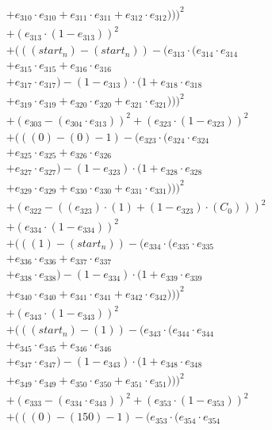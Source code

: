 \documentclass[10pt, a4paper]{article}
\begin{document}
\begin{small}
\begin{align*}
& + e_{310} \cdot e_{310} + e_{311} \cdot e_{311} + e_{312} \cdot e_{312})))^{2} \\
& + (e_{313} \cdot (1 - e_{313}))^{2} \\
& + (((start_n) - (start_n)) - (e_{313} \cdot (e_{314} \cdot e_{314} \\
& + e_{315} \cdot e_{315} + e_{316} \cdot e_{316} \\
& + e_{317} \cdot e_{317}) - (1 - e_{313}) \cdot (1 + e_{318} \cdot e_{318} \\
& + e_{319} \cdot e_{319} + e_{320} \cdot e_{320} + e_{321} \cdot e_{321})))^{2} \\
& + (e_{303} - (e_{304} \cdot e_{313}))^{2} + (e_{323} \cdot (1 - e_{323}))^{2} \\
& + (((0) - (0) - 1) - (e_{323} \cdot (e_{324} \cdot e_{324} \\
& + e_{325} \cdot e_{325} + e_{326} \cdot e_{326} \\
& + e_{327} \cdot e_{327}) - (1 - e_{323}) \cdot (1 + e_{328} \cdot e_{328} \\
& + e_{329} \cdot e_{329} + e_{330} \cdot e_{330} + e_{331} \cdot e_{331})))^{2} \\
& + (e_{322} - ((e_{323})  \cdot  (1) + (1 - e_{323})  \cdot  (C_{0})))^{2} \\
& + (e_{334} \cdot (1 - e_{334}))^{2} \\
& + (((1) - (start_n)) - (e_{334} \cdot (e_{335} \cdot e_{335} \\
& + e_{336} \cdot e_{336} + e_{337} \cdot e_{337} \\
& + e_{338} \cdot e_{338}) - (1 - e_{334}) \cdot (1 + e_{339} \cdot e_{339} \\
& + e_{340} \cdot e_{340} + e_{341} \cdot e_{341} + e_{342} \cdot e_{342})))^{2} \\
& + (e_{343} \cdot (1 - e_{343}))^{2} \\
& + (((start_n) - (1)) - (e_{343} \cdot (e_{344} \cdot e_{344} \\
& + e_{345} \cdot e_{345} + e_{346} \cdot e_{346} \\
& + e_{347} \cdot e_{347}) - (1 - e_{343}) \cdot (1 + e_{348} \cdot e_{348} \\
& + e_{349} \cdot e_{349} + e_{350} \cdot e_{350} + e_{351} \cdot e_{351})))^{2} \\
& + (e_{333} - (e_{334} \cdot e_{343}))^{2} + (e_{353} \cdot (1 - e_{353}))^{2} \\
& + (((0) - (150) - 1) - (e_{353} \cdot (e_{354} \cdot e_{354} \\

\end{align*}
\end{small}
\end{document}
